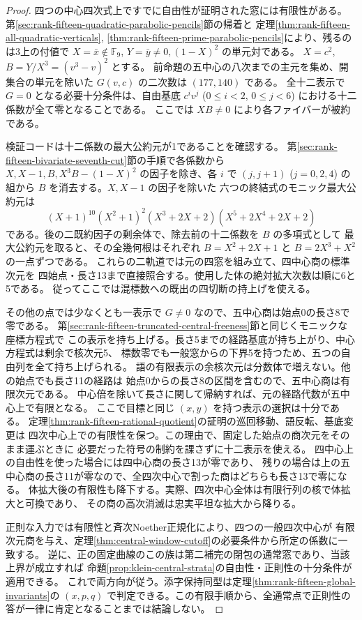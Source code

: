 \begin{proof}
四つの中心四次式上ですでに自由性が証明された窓には有限性がある。
第\ref{sec:rank-fifteen-quadratic-parabolic-pencils}節の帰着と
定理\ref{thm:rank-fifteen-all-quadratic-verticals},
\ref{thm:rank-fifteen-prime-parabolic-pencils}により、残るのは3上の付値で
$X=\bar x\notin\mathbb F_9$, $Y=\bar y\ne0,(1-X)^2$ の単元対である。
$X=c^2$, $B=Y/X^3=(v^3-v)^2$ とする。
前命題の五中心の八次までの主元を集め、開集合の単元を除いた
$G(v,c)$ の二次数は $(177,140)$ である。
全十二表示で $G=0$ となる必要十分条件は、自由基底
$c^i v^j$ ($0\le i<2$, $0\le j<6$) における十二係数が全て零となることである。
ここでは $XB\ne0$ により各ファイバーが被約である。

検証コードは十二係数の最大公約元が1であることを確認する。
第\ref{sec:rank-fifteen-bivariate-seventh-cut}節の手順で各係数から
$X, X-1,B,X^3B-(1-X)^2$ の因子を除き、各 $i$ で $(j,j+1)$
($j=0,2,4$) の組から $B$ を消去する。$X, X-1$ の因子を除いた
六つの終結式のモニック最大公約元は
\[
 (X+1)^{10}(X^2+1)^2 (X^3+2X+2)(X^5+2X^4+2X+2)
\]
である。後の二既約因子の剰余体で、除去前の十二係数を $B$ の多項式として
最大公約元を取ると、その全幾何根はそれぞれ
$B=X^2+2X+1$ と $B=2X^3+X^2$ の一点ずつである。
これらの二軌道では元の四窓を組み立て、四中心商の標準次元を
四始点・長さ13まで直接照合する。使用した体の絶対拡大次数は順に6と5である。
従ってここでは混標数への既出の四切断の持上げを使える。

その他の点では少なくとも一表示で $G\ne0$ なので、五中心商は始点0の長さ8で零である。
第\ref{sec:rank-fifteen-truncated-central-freeness}節と同じくモニックな座標方程式で
この表示を持ち上げる。長さ5までの経路基底が持ち上がり、中心方程式は剰余で核次元5、
標数零でも一般窓からの下界5を持つため、五つの自由列を全て持ち上げられる。
語の有限表示の余核次元は分数体で増えない。他の始点でも長さ11の経路は
始点0からの長さ8の区間を含むので、五中心商は有限次元である。
中心倍を除いて長さに関して帰納すれば、元の経路代数が五中心上で有限となる。
ここで目標と同じ $(x,y)$ を持つ表示の選択は十分である。
定理\ref{thm:rank-fifteen-rational-quotient}の証明の巡回移動、語反転、基底変更は
四次中心上での有限性を保つ。この理由で、固定した始点の商次元をそのまま運ぶときに
必要だった符号の制約を課さずに十二表示を使える。
四中心上の自由性を使った場合には四中心商の長さ13が零であり、
残りの場合は上の五中心商の長さ11が零なので、全四次中心で割った商はどちらも長さ13で零になる。
体拡大後の有限性も降下する。実際、四次中心全体は有限行列の核で体拡大と可換であり、
その商の高次消滅は忠実平坦な拡大から降りる。

正則な入力では有限性と斉次Noether正規化により、四つの一般四次中心が
有限次元商を与え、定理\ref{thm:central-window-cutoff}の必要条件から所定の係数に一致する。
逆に、正の固定曲線のこの族は第二補完の閉包の通常窓であり、当該上界が成立すれば
命題\ref{prop:klein-central-strata}の自由性・正則性の十分条件が適用できる。
これで両方向が従う。添字保持同型は定理\ref{thm:rank-fifteen-global-invariants}の
$(x,p,q)$ で判定できる。この有限手順から、全通常点で正則性の答が一律に肯定となることまでは結論しない。
\end{proof}
